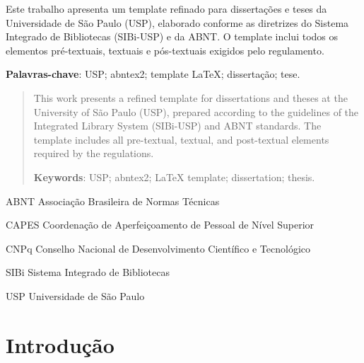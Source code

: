 \documentclass[
    12pt,                   %
    a4paper,                %
    openright,              %
    oneside,                %
    english,                %
    brazil                  %
]{abntex2}
\theoremstyle{plain}
\theoremstyle{definition}
\theoremstyle{remark}
\begin{document}
\begin{resumo}
    Este trabalho apresenta um template refinado para
    disserta\c{c}\~oes e teses da Universidade de S\~ao Paulo
    (USP), elaborado conforme as diretrizes do Sistema
    Integrado de Bibliotecas (SIBi-USP) e da ABNT.
    O template inclui todos os elementos pr\'e-textuais,
    textuais e p\'os-textuais exigidos pelo regulamento.

    \textbf{Palavras-chave}: USP; abntex2; template LaTeX;
    disserta\c{c}\~ao; tese.
\end{resumo}

\begin{abstract}
    This work presents a refined template for dissertations
    and theses at the University of S\~ao Paulo (USP),
    prepared according to the guidelines of the Integrated
    Library System (SIBi-USP) and ABNT standards.
    The template includes all pre-textual, textual, and
    post-textual elements required by the regulations.

    \textbf{Keywords}: USP; abntex2; LaTeX template;
    dissertation; thesis.
\end{abstract}

\listoffigures*

\listoftables*

\begin{siglas}
    \item[ABNT] Associa\c{c}\~ao Brasileira de Normas T\'ecnicas
    \item[CAPES] Coordena\c{c}\~ao de Aperfei\c{c}oamento de
        Pessoal de N\'ivel Superior
    \item[CNPq] Conselho Nacional de Desenvolvimento
        Cient\'ifico e Tecnol\'ogico
    \item[SIBi] Sistema Integrado de Bibliotecas
    \item[USP] Universidade de S\~ao Paulo
\end{siglas}

\tableofcontents*


\textual

\chapter{Introdu\c{c}\~ao}
\label{chap:intro}
\end{document}
